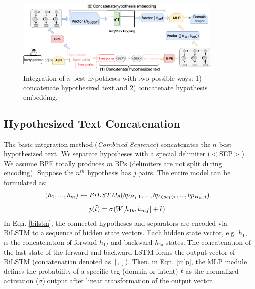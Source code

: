 \begin{figure}[t!]
	\vspace{2em}
	\includegraphics[width=0.9\textwidth]{Graph/speech/Compress.png}
	\vspace{1em}
	\caption{Integration of $n$-best hypotheses with two possible ways: 1) concatenate hypothesized text  and 2) concatenate hypothesis embedding.}
	\label{fig:integration}
\end{figure}

\subsection{Hypothesized Text Concatenation}
The basic integration method (\textit{Combined Sentence}) concatenates the $n$-best hypothesized text. We separate hypotheses with a special delimiter ($<$SEP$>$). We assume BPE totally produces $m$ BPs (delimiters are not split during encoding). Suppose the $n^{th}$ hypothesis has $j$ pairs. The entire model can be formulated as:
\begin{equation}
\small{
	(h_1, ... , h_m)\leftarrow BiLSTM_{\theta}(bp_{H_1, 1},...,bp_{<sep>},...,bp_{H_n, j})
}
\label{bilstm}
\end{equation}
\begin{equation}
\small{
	p(\Tilde{t}) = \sigma(W[h_{1b}, h_{mf}] +b)
}
\label{mlp}
\end{equation}
In Eqn. \ref{bilstm}, the connected hypotheses and separators are encoded via BiLSTM to a sequence of hidden state vectors. Each hidden state vector, e.g. $h_1$, is the concatenation of forward $h_{1f}$ and backward $h_{1b}$ states. The concatenation of the last state of the forward and backward LSTM forms the output vector of BiLSTM (concatenation denoted as $[,]$). Then, in Eqn. \ref{mlp}, the MLP module defines the probability of a specific tag (domain or intent)  $\Tilde{t}$ as the normalized activation ($\sigma$) output  after linear transformation of the output vector.




